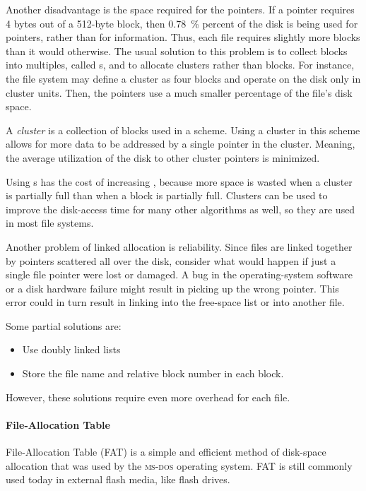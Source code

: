 Another disadvantage is the space required for the pointers.
If a pointer requires 4 bytes out of a 512-byte block, then \SI{0.78}{\percent} percent of the disk is being used for pointers, rather than for information.
Thus, each file requires slightly more blocks than it would otherwise.
The usual solution to this problem is to collect blocks into multiples, called s, and to allocate clusters rather than blocks.
For instance, the file system may define a cluster as four blocks and operate on the disk only in cluster units.
Then, the pointers use a much smaller percentage of the file’s disk space.

\begin{definition}[Cluster]\label{def:Disk_Cluster}
  A \emph{cluster} is a collection of blocks used in a  scheme.
  Using a cluster in this scheme allows for more data to be addressed by a single pointer in the cluster.
  Meaning, the average utilization of the disk to other cluster pointers is minimized.
\end{definition}

Using s has the cost of increasing , because more space is wasted when a cluster is partially full than when a block is partially full.
Clusters can be used to improve the disk-access time for many other algorithms as well, so they are used in most file systems.

Another problem of linked allocation is reliability.
Since files are linked together by pointers scattered all over the disk, consider what would happen if just a single file pointer were lost or damaged.
A bug in the operating-system software or a disk hardware failure might result in picking up the wrong pointer.
This error could in turn result in linking into the free-space list or into another file.

Some partial solutions are:
\begin{itemize}[noitemsep]
\item Use doubly linked lists
\item Store the file name and relative block number in each block.
\end{itemize}
However, these solutions require even more overhead for each file.

\paragraph{File-Allocation Table}\label{par:File_Allocation_Table}
File-Allocation Table (FAT) is a simple and efficient method of disk-space allocation that was used by the \textsc{ms-dos} operating system.
FAT is still commonly used today in external flash media, like flash drives.

